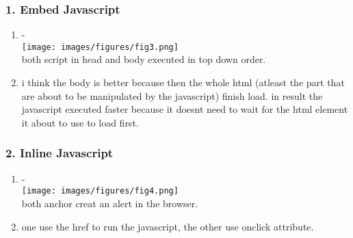 \documentclass[12pt,titlepage]{article}
\begin{document}
\subsubsection*{1. Embed Javascript}
\begin{enumerate}
    \item - \\ \texttt{[image: images/figures/fig3.png]} \\ both script in head and body executed in top down order. 
    \item i think the body is better because then the whole html (atleast the part that are about to be manipulated by the javascript) finish load. in result the javascript executed faster because it doesnt need to wait for the html element it about to use to load first. 
\end{enumerate}

\subsubsection*{2. Inline Javascript}
\begin{enumerate}
    \item - \\ \texttt{[image: images/figures/fig4.png]} \\ both anchor creat an alert in the browser. 
    \item one use the href to run the javascript, the other use onclick attribute. 
\end{enumerate}
\end{document}
